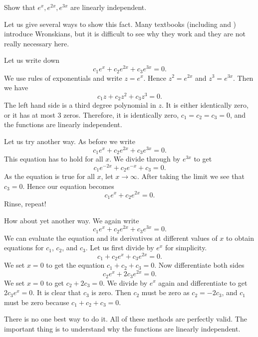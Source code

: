 \documentclass[12pt]{book}
\begin{document}
\begin{example}
Show that $e^x, e^{2x}, e^{3x}$ are linearly independent.

Let us give several ways to show this fact.
Many textbooks (including \cite{EP} and
\cite{F}) introduce Wronskians, but it is difficult to see why they work and
they are not really necessary here.

Let us write down
\begin{equation*}
c_1 e^x + c_2 e^{2x} + c_3 e^{3x} = 0.
\end{equation*}
We use rules of exponentials and write $z = e^x$.  Hence $z^2 = e^{2x}$
and $z^3 = e^{3x}$.  Then we have
\begin{equation*}
c_1 z + c_2 z^2 + c_3 z^3 = 0.
\end{equation*}
The left hand side is a third degree polynomial in $z$.
It is either identically zero,
or it has at most 3 zeros.  Therefore, it is identically zero,
$c_1 = c_2 = c_3 = 0$, and the functions are linearly independent.

Let us try another way.  As before we write
\begin{equation*}
c_1 e^x + c_2 e^{2x} + c_3 e^{3x} = 0.
\end{equation*}
This equation has to hold for all $x$.  We divide through
by $e^{3x}$ to get
\begin{equation*}
c_1 e^{-2x} + c_2 e^{-x} + c_3 = 0.
\end{equation*}
As the equation is true for all $x$, let $x \to \infty$.  After taking the
limit we see that $c_3 = 0$.  Hence our equation becomes
\begin{equation*}
c_1 e^x + c_2 e^{2x} = 0.
\end{equation*}
Rinse, repeat!

How about yet another way.  We again write
\begin{equation*}
c_1 e^x + c_2 e^{2x} + c_3 e^{3x} = 0.
\end{equation*}
We can evaluate the equation and its derivatives at different
values of $x$ to obtain equations for
$c_1$, $c_2$, and $c_3$.
Let us first
divide by $e^{x}$ for simplicity.
\begin{equation*}
c_1 + c_2 e^{x} + c_3 e^{2x} = 0.
\end{equation*}
We set $x=0$ to get the equation $c_1 + c_2 + c_3 = 0$.  Now differentiate
both sides
\begin{equation*}
c_2 e^{x} + 2 c_3 e^{2x} = 0 .
\end{equation*}
We set $x=0$ to get $c_2 + 2c_3 = 0$.  We divide by $e^x$ again and
differentiate to get
$2 c_3 e^{x} = 0$.  It is clear that $c_3$ is zero.  Then $c_2$ must be
zero as $c_2 = -2c_3$, and $c_1$ must be zero because $c_1 + c_2 + c_3 = 0$.

There is no one best way to do it.  All of these methods are perfectly valid.
The important thing is to understand why the functions are linearly
independent.
\end{example}
\end{document}
